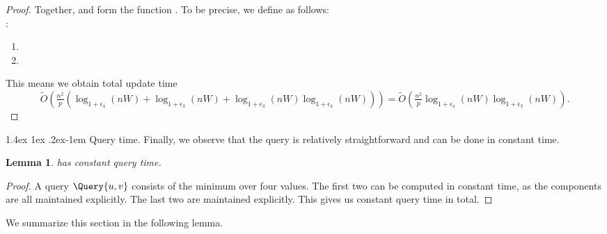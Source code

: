 \documentclass[11pt]{article}
\makeatletter
\newtheorem{lemma}[theorem]{Lemma}
\theoremstyle{definition}
\theoremstyle{remark}
\renewcommand{\paragraph}{%
  \@startsection{paragraph}{4}%
  {\z@}{1.4ex \@plus 1ex \@minus .2ex}{-1em}%
  {\normalfont\normalsize\bfseries}%
}
\makeatother
\begin{document}
\begin{titlepage}
\begin{proof}
   Together, \UpdateNbrBunchDSBunchChange and \UpdateAdjacentDSBunchChange form the function \UpdateAdjacentDS. To be precise, we define \UpdateAdjacentDS as follows: \\
:
\begin{enumerate}
    \item {}
    \item {}
\end{enumerate}
This means we obtain total update time $$\tilde O(\tfrac{n^2}{p}(\log_{1+\epsilon_4}(nW)+\log_{1+\epsilon_3}(nW)+\log_{1+\epsilon_3}(nW)\log_{1+\epsilon_4}(nW)))=\tilde O(\tfrac{n^2}{p}\log_{1+\epsilon_4}(nW)\log_{1+\epsilon_3}(nW)).$$
\end{proof}

\paragraph{Query time.}
Finally, we observe that the query is relatively straightforward and can be done in constant time. 

\begin{lemma}
    \DynAPSPtwo has constant query time. 
\end{lemma}
\begin{proof}
    A query $\Query{u,v}$ consists of the minimum over four values. The first two can be computed in constant time, as the components are all maintained explicitly. The last two are maintained explicitly. This gives us constant query time in total. 
\end{proof}



We summarize this section in the following lemma. 


\end{titlepage}
\end{document}
